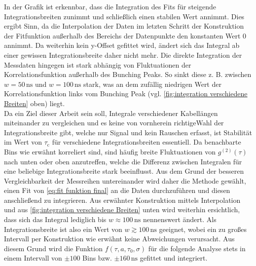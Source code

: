 In der Grafik ist erkennbar, dass die Integration des Fits für steigende Integrationsbreiten zunimmt und schließlich einen stabilen Wert annimmt. 
Dies ergibt Sinn, da die Interpolation der Daten im letzten Schritt der Konstruktion der Fitfunktion außerhalb des Bereichs der Datenpunkte den konstanten Wert 0 annimmt. 
Da weiterhin kein y-Offset gefittet wird, ändert sich das Integral ab einer gewissen Integrationsbreite daher nicht mehr. 
Die direkte Integration der Messdaten hingegen ist stark abhängig von Fluktuationen der Korrelationsfunktion außerhalb des Bunching Peaks. 
So sinkt diese z. B. zwischen $w=50\,\mathrm{ns}$ und $w=100\,\mathrm{ns}$ stark, was an dem zufällig niedrigen Wert der Korrelationsfunktion links vom Bunching Peak (vgl. \autoref{fig:integration verschiedene Breiten} oben) liegt. \\

Da ein Ziel dieser Arbeit sein soll, Integrale verschiedener Kabellängen miteinander zu vergleichen und es keine von vornherein \glqq richtige\grqq\;Wahl der Integrationsbreite gibt, welche nur Signal und kein Rauschen erfasst, ist Stabilität im Wert von $\tau_{\mathrm{c}}$ für verschiedene Integrationsbreiten essentiell. 
Da benachbarte Bins wie erwähnt korreliert sind, sind häufig breite Fluktuationen von $g^{(2)}(\tau)$ nach unten oder oben anzutreffen, welche die Differenz zwischen Integralen für eine beliebige Integrationsbreite stark beeinflusst. 
Aus dem Grund der besseren Vergleichbarkeit der Messreihen untereinander wird daher die Methode gewählt, einen Fit von \autoref{eq:fit funktion final} an die Daten durchzuführen und diesen anschließend zu integrieren. 
Aus erwähnter Konstruktion mittels Interpolation und aus \autoref{fig:integration verschiedene Breiten} unten wird weiterhin ersichtlich, dass sich das Integral lediglich bis $w\approx 100\,\mathrm{ns}$ nennenswert ändert. 
Als Integrationsbreite ist also ein Wert von $w\gtrsim 100\,\mathrm{ns}$ geeignet, wobei ein zu großes Intervall per Konstruktion wie erwähnt keine Abweichungen verursacht. 
Aus diesem Grund wird die Funktion $f(\tau, a, \tau_0, \sigma)$ für die folgende Analyse stets in einem Intervall von $\pm 100$ Bins bzw. $\pm 160\,\mathrm{ns}$ gefittet und integriert. 


